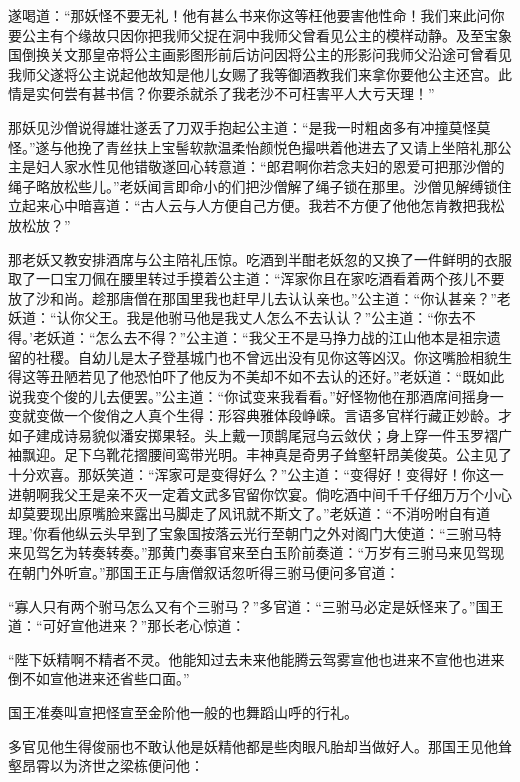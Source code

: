 \documentclass[12pt,UTF8]{ctexbook}
\begin{document}
遂喝道：“那妖怪不要无礼！他有甚么书来你这等枉他要害他性命！我们来此问你要公主有个缘故只因你把我师父捉在洞中我师父曾看见公主的模样动静。及至宝象国倒换关文那皇帝将公主画影图形前后访问因将公主的形影问我师父沿途可曾看见我师父遂将公主说起他故知是他儿女赐了我等御酒教我们来拿你要他公主还宫。此情是实何尝有甚书信？你要杀就杀了我老沙不可枉害平人大亏天理！”

那妖见沙僧说得雄壮遂丢了刀双手抱起公主道：“是我一时粗卤多有冲撞莫怪莫怪。”遂与他挽了青丝扶上宝髻软款温柔怡颜悦色撮哄着他进去了又请上坐陪礼那公主是妇人家水性见他错敬遂回心转意道：“郎君啊你若念夫妇的恩爱可把那沙僧的绳子略放松些儿。”老妖闻言即命小的们把沙僧解了绳子锁在那里。沙僧见解缚锁住立起来心中暗喜道：“古人云与人方便自己方便。我若不方便了他他怎肯教把我松放松放？”

那老妖又教安排酒席与公主陪礼压惊。吃酒到半酣老妖忽的又换了一件鲜明的衣服取了一口宝刀佩在腰里转过手摸着公主道：“浑家你且在家吃酒看着两个孩儿不要放了沙和尚。趁那唐僧在那国里我也赶早儿去认认亲也。”公主道：“你认甚亲？”老妖道：“认你父王。我是他驸马他是我丈人怎么不去认认？”公主道：“你去不得。’老妖道：“怎么去不得？”公主道：“我父王不是马挣力战的江山他本是祖宗遗留的社稷。自幼儿是太子登基城门也不曾远出没有见你这等凶汉。你这嘴脸相貌生得这等丑陋若见了他恐怕吓了他反为不美却不如不去认的还好。”老妖道：“既如此说我变个俊的儿去便罢。”公主道：“你试变来我看看。”好怪物他在那酒席间摇身一变就变做一个俊俏之人真个生得：形容典雅体段峥嵘。言语多官样行藏正妙龄。才如子建成诗易貌似潘安掷果轻。头上戴一顶鹊尾冠乌云敛伏；身上穿一件玉罗褶广袖飘迎。足下乌靴花摺腰间鸾带光明。丰神真是奇男子耸壑轩昂美俊英。公主见了十分欢喜。那妖笑道：“浑家可是变得好么？”公主道：“变得好！变得好！你这一进朝啊我父王是亲不灭一定着文武多官留你饮宴。倘吃酒中间千千仔细万万个小心却莫要现出原嘴脸来露出马脚走了风讯就不斯文了。”老妖道：“不消吩咐自有道理。’你看他纵云头早到了宝象国按落云光行至朝门之外对阁门大使道：“三驸马特来见驾乞为转奏转奏。”那黄门奏事官来至白玉阶前奏道：“万岁有三驸马来见驾现在朝门外听宣。”那国王正与唐僧叙话忽听得三驸马便问多官道：

“寡人只有两个驸马怎么又有个三驸马？”多官道：“三驸马必定是妖怪来了。”国王道：“可好宣他进来？”那长老心惊道：

“陛下妖精啊不精者不灵。他能知过去未来他能腾云驾雾宣他也进来不宣他也进来倒不如宣他进来还省些口面。”

国王准奏叫宣把怪宣至金阶他一般的也舞蹈山呼的行礼。

多官见他生得俊丽也不敢认他是妖精他都是些肉眼凡胎却当做好人。那国王见他耸壑昂霄以为济世之梁栋便问他：
\end{document}
